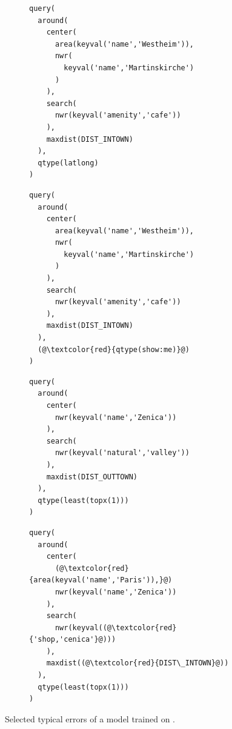 \begin{figure}[h]
  \centering
  \begin{subfigure}{\textwidth}
    \begin{minipage}{0.48\textwidth}
      \begin{lstlisting}[style=MyMRL,title={Gold MRL},basicstyle={\ttfamily\scriptsize}]
query(
  around(
    center(
      area(keyval('name','Westheim')),
      nwr(
        keyval('name','Martinskirche')
      )
    ),
    search(
      nwr(keyval('amenity','cafe'))
    ),
    maxdist(DIST_INTOWN)
  ),
  qtype(latlong)
)
      \end{lstlisting}
    \end{minipage}
    \hfill
    \begin{minipage}{0.48\textwidth}
      \begin{lstlisting}[style=MyMRL,title={System MRL},basicstyle={\ttfamily\scriptsize{}}]
query(
  around(
    center(
      area(keyval('name','Westheim')),
      nwr(
        keyval('name','Martinskirche')
      )
    ),
    search(
      nwr(keyval('amenity','cafe'))
    ),
    maxdist(DIST_INTOWN)
  ),
  (@\textcolor{red}{qtype(show:me)}@)
)
      \end{lstlisting}
    \end{minipage}
    \caption{}
    \label{fig:cafes-near-martinskirche}
  \end{subfigure}
  \begin{subfigure}{\textwidth}
    \begin{minipage}{0.48\textwidth}
      \begin{lstlisting}[style=MyMRL,title={Gold MRL},basicstyle={\ttfamily\scriptsize}]
query(
  around(
    center(
      nwr(keyval('name','Zenica'))
    ),
    search(
      nwr(keyval('natural','valley'))
    ),
    maxdist(DIST_OUTTOWN)
  ),
  qtype(least(topx(1)))
)
      \end{lstlisting}
    \end{minipage}
    \hfill
    \begin{minipage}{0.48\textwidth}
      \begin{lstlisting}[style=MyMRL,title={System MRL},basicstyle={\ttfamily\scriptsize{}}]
query(
  around(
    center(
      (@\textcolor{red}{area(keyval('name','Paris')),}@)
      nwr(keyval('name','Zenica'))
    ),
    search(
      nwr(keyval((@\textcolor{red}{'shop,'cenica'}@)))
    ),
    maxdist((@\textcolor{red}{DIST\_INTOWN}@))
  ),
  qtype(least(topx(1)))
)
      \end{lstlisting}
    \end{minipage}
    \caption{}
    \label{fig:valleys-around-zenica}
  \end{subfigure}
  \caption[Errors after \nlmapstwo{} Training]{Selected typical errors of a
    model trained on \nlmapstwo{}.}
  \label{fig:nlmaps-v2-reality-check}
\end{figure}

